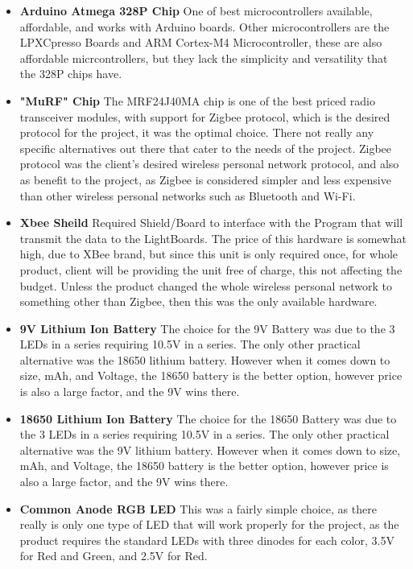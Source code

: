 \documentclass[12pt]{article}
\begin{document}
{		%
		{\renewcommand\labelitemi{}
			\begin{itemize}
				\item \textbf{Arduino Atmega 328P Chip}
				One of best microcontrollers available, affordable, and works with Arduino boards. Other microcontrollers are the LPXCpresso Boards and ARM Cortex-M4 Microcontroller, these are also affordable micrcontrollers, but they lack the simplicity and versatility that the 328P chips have. 
				\item \textbf{"MuRF" Chip}
				The MRF24J40MA chip is one of the best priced radio transceiver modules, with support for Zigbee protocol, which is the desired protocol for the project, it was the optimal choice. There not really any specific alternatives out there that cater to the needs of the project. Zigbee protocol was the client's desired wireless personal network protocol, and also as benefit to the project, as Zigbee is considered simpler and less expensive than other wireless personal networks such as Bluetooth and Wi-Fi.
				\item \textbf{Xbee Sheild}
				Required Shield/Board to interface with the Program that will transmit the data to the LightBoards. The price of this hardware is somewhat high, due to XBee brand, but since this unit is only required once, for whole product, client will be providing the unit free of charge, this not affecting the budget. Unless the product changed the whole wireless personal network to something other than Zigbee, then this was the only available hardware. 
				\item \textbf{9V Lithium Ion Battery}
				The choice for the 9V Battery was due to the 3 LEDs in a series requiring 10.5V in a series. The only other practical alternative was the 18650 lithium battery. However when it comes down to size, mAh, and Voltage, the 18650 battery is the better option, however price is also a large factor, and the 9V wins there.
				\item \textbf{18650 Lithium Ion Battery}
				The choice for the 18650 Battery was due to the 3 LEDs in a series requiring 10.5V in a series. The only other practical alternative was the 9V lithium battery. However when it comes down to size, mAh, and Voltage, the 18650 battery is the better option, however price is also a large factor, and the 9V wins there.
				\item \textbf{Common Anode RGB LED}
				This was a fairly simple choice, as there really is only one type of LED that will work properly for the project, as the product requires the standard LEDs with three dinodes for each color, 3.5V for Red and Green, and 2.5V for Red.

\end{itemize}}}
\end{document}
